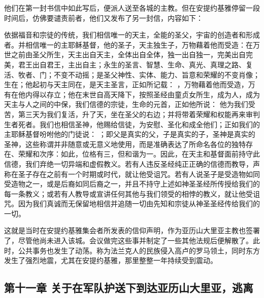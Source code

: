 他们在第一封书信中如此写后，便派人送至各城的主教。但在安提约基雅停留一段时间后，仿佛要谴责前者，他们又发布了另一封信，内容如下：\par

\par

依据福音和宗徒的传统，我们相信唯一的天主，全能的圣父，宇宙的创造者和形成者。并相信唯一的主耶稣基督，他的圣子，天主独生子，万物藉着他而受造：在万世之前由圣父所生，天主出自天主，全体出自全体，独一出自独一，完美出自完美，君王出自君王，主出自主；永生的圣言、智慧、生命、真光、真理之路、复活、牧者、门；不变不动摇；是圣父神性、实体、能力、旨意和荣耀的不变肖像；生在；他起初与天主同在，是天主圣言，正如所记载： ，万物藉着他而受造，万有在他内得以存立；他在末世自高天降下，按照圣经由童贞女所生，成为人，成为天主与人之间的中保，我们信德的宗徒，生命的元首，正如他所说： 他为我们受苦，第三天为我们复活，升了天，坐在圣父的右边；并将带着荣耀和权能再来审判生者死者。我们也相信圣神，他赐给信徒，为安慰、圣化和成全他们；正如我们的主耶稣基督吩咐他的门徒说： ；即父是真实的父，子是真实的子，圣神是真实的圣神，这些称谓并非随意或无意义地使用，而是准确表达了所命名各位的独特存在、荣耀和次序：如此，位格有三，但和谐为一。因此，在天主和基督面前持守此信德，我们弃绝一切异端和虚假教义。若有人违反圣经纯正正确的信德而教导，声称在圣子存在之前有一个时期或时代，就让他受诅咒。若有人说圣子是受造物如同受造物之一，或是后裔如同后裔之一，并且不持守上述如神圣圣经所传授给我们的每一条教义；或若有人教导或宣讲任何其他与我们领受的相悖的教义，就让他受诅咒。因为我们真诚而无保留地相信并追随一切由先知和宗徒从神圣圣经传给我们的一切。\par

这就是当时在安提约基雅集会者所发表的信仰声明，作为亚历山大里亚主教也签署了，尽管他尚未进入该城。会议做完这些事并制定了一些其他法规后便解散了。此时，公共事务也发生了动荡。称为法兰克人的民族侵入高卢的罗马领土，同时东方发生了强烈地震，尤其在安提约基雅，那里整整一年持续受到震动。\par


\subsection{第十一章  关于在军队护送下到达亚历山大里亚，逃离}

